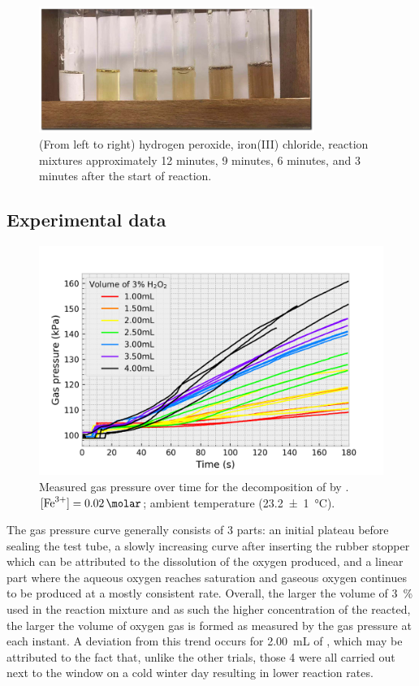 \documentclass[a4paper, 12pt]{article}
\begin{document}
\begin{figure}[H]
    \centering
    \includegraphics[width=0.8\textwidth]{imgs/colours}
    \caption{(From left to right) hydrogen peroxide, iron(III) chloride, reaction mixtures approximately 12 minutes, 9 minutes, 6 minutes, and 3 minutes after the start of reaction. }
    \label{fig:colours}
\end{figure}

\subsection*{Experimental data}
\begin{figure}[H]
    \centering
    \includegraphics[width=\textwidth]{data/raw_data}
    \caption{Measured gas pressure over time for the decomposition of  by . $[\ce{Fe^{3+}}] = \SI{0.02}{\molar}$; ambient temperature (\SI{23.2(10)}{\celsius}). }
    \label{fig:raw-data}
\end{figure}

The gas pressure curve generally consists of 3 parts: an initial plateau before sealing the test tube, a slowly increasing curve after inserting the rubber stopper which can be attributed to the dissolution of the oxygen produced, and a linear part where the aqueous oxygen reaches saturation and gaseous oxygen continues to be produced at a mostly consistent rate. Overall, the larger the volume of \SI{3}{\%}   used in the reaction mixture and as such the higher concentration of the  reacted, the larger the volume of oxygen gas is formed as measured by the gas pressure at each instant. A deviation from this trend occurs for \SI{2.00}{\mL} of , which may be attributed to the fact that, unlike the other trials, those 4 were all carried out next to the window on a cold winter day resulting in lower reaction rates.
\end{document}
